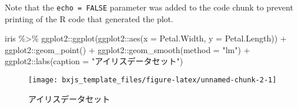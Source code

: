 \documentclass[
  12pt,
  a4paper,
  xelatex,
  ja=standard]{bxjsarticle}
\newenvironment{Shaded}{\begin{snugshade}}{\end{snugshade}}
\newcommand{\AttributeTok}[1]{\textcolor[rgb]{0.77,0.63,0.00}{#1}}
\newcommand{\FunctionTok}[1]{\textcolor[rgb]{0.00,0.00,0.00}{#1}}
\newcommand{\NormalTok}[1]{#1}
\newcommand{\SpecialCharTok}[1]{\textcolor[rgb]{0.00,0.00,0.00}{#1}}
\newcommand{\StringTok}[1]{\textcolor[rgb]{0.31,0.60,0.02}{#1}}
\begin{document}
Note that the \texttt{echo\ =\ FALSE} parameter was added to the code
chunk to prevent printing of the R code that generated the plot.

\newpage

\begin{Shaded}
\begin{Highlighting}[numbers=left,,]
\NormalTok{iris }\SpecialCharTok{\%\textgreater{}\%} 
\NormalTok{  ggplot2}\SpecialCharTok{::}\FunctionTok{ggplot}\NormalTok{(ggplot2}\SpecialCharTok{::}\FunctionTok{aes}\NormalTok{(}\AttributeTok{x =}\NormalTok{ Petal.Width, }\AttributeTok{y =}\NormalTok{ Petal.Length)) }\SpecialCharTok{+} 
\NormalTok{    ggplot2}\SpecialCharTok{::}\FunctionTok{geom\_point}\NormalTok{() }\SpecialCharTok{+} 
\NormalTok{    ggplot2}\SpecialCharTok{::}\FunctionTok{geom\_smooth}\NormalTok{(}\AttributeTok{method =} \StringTok{"lm"}\NormalTok{) }\SpecialCharTok{+}
\NormalTok{    ggplot2}\SpecialCharTok{::}\FunctionTok{labs}\NormalTok{(}\AttributeTok{caption =} \StringTok{"アイリスデータセット"}\NormalTok{)}
\end{Highlighting}
\end{Shaded}

\begin{figure}

{\centering \texttt{[image: bxjs\_template\_files/figure-latex/unnamed-chunk-2-1]} 

}

\caption{アイリスデータセット}\label{fig:unnamed-chunk-2}
\end{figure}
\end{document}
